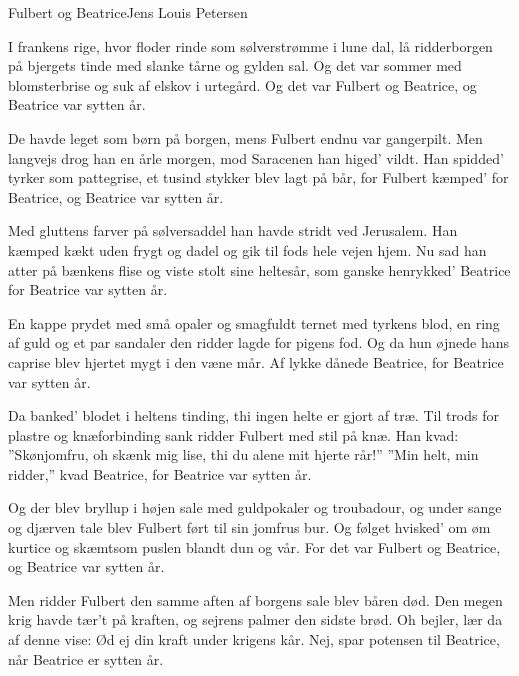 \begin{sang}{Fulbert og Beatrice}{Jens Louis Petersen}%
\begin{multicols}{2}\multicolinit
\begin{vers}
I frankens rige, hvor floder rinde
\verseend
som sølverstrømme i lune dal,
\verseend
lå ridderborgen på bjergets tinde
\verseend
med slanke tårne og gylden sal.
\verseend
Og det var sommer med blomsterbrise
\verseend
og suk af elskov i urtegård.
\verseend
Og det var Fulbert og Beatrice,
\verseend
og Beatrice var sytten år.
\end{vers}
\begin{vers}
De havde leget som børn på borgen,
\verseend
mens Fulbert endnu var gangerpilt.
\verseend
Men langvejs drog han en årle morgen,
\verseend
mod Saracenen han higed' vildt.
\verseend
Han spidded' tyrker som pattegrise,
\verseend
et tusind stykker blev lagt på bår,
\verseend
for Fulbert kæmped' for Beatrice,
\verseend
og Beatrice var sytten år.
\end{vers}
\begin{vers}
Med gluttens farver på sølversaddel
\verseend
han havde stridt ved Jerusalem.
\verseend
Han kæmped kækt uden frygt og dadel
\verseend
og gik til fods hele vejen hjem.
\verseend
Nu sad han atter på bænkens flise
\verseend
og viste stolt sine heltesår,
\verseend
som ganske henrykked' Beatrice
\verseend
for Beatrice var sytten år.
\end{vers}
\begin{vers}
En kappe prydet med små opaler
\verseend
og smagfuldt ternet med tyrkens blod,
\verseend
en ring af guld og et par sandaler
\verseend
den ridder lagde for pigens fod.
\verseend
Og da hun øjnede hans caprise
\verseend
blev hjertet mygt i den væne mår.
\verseend
Af lykke dånede Beatrice,
\verseend
for Beatrice var sytten år.
\end{vers}
\begin{vers}
Da banked' blodet i heltens tinding,
\verseend
thi ingen helte er gjort af træ.
\verseend
Til trods for plastre og knæforbinding
\verseend
sank ridder Fulbert med stil på knæ.
\verseend
Han kvad: ''Skønjomfru, oh skænk mig lise,
\verseend
thi du alene mit hjerte rår!''
\verseend
''Min helt, min ridder,'' kvad Beatrice,
\verseend
for Beatrice var sytten år.
\end{vers}
\begin{vers}
Og der blev bryllup i højen sale
\verseend
med guldpokaler og troubadour,
\verseend
og under sange og djærven tale
\verseend
blev Fulbert ført til sin jomfrus bur.
\verseend
Og følget hvisked' om øm kurtice
\verseend
og skæmtsom puslen blandt dun og vår.
\verseend
For det var Fulbert og Beatrice,
\verseend
og Beatrice var sytten år.
\end{vers}
\begin{vers}
Men ridder Fulbert den samme aften
\verseend
af borgens sale blev båren død.
\verseend
Den megen krig havde tær't på kraften,
\verseend
og sejrens palmer den sidste brød.
\verseend
Oh bejler, lær da af denne vise:
\verseend
Ød ej din kraft under krigens kår.
\verseend
Nej, spar potensen til Beatrice,
\verseend
når Beatrice er sytten år.
\end{vers}
\end{multicols}
\end{sang}
